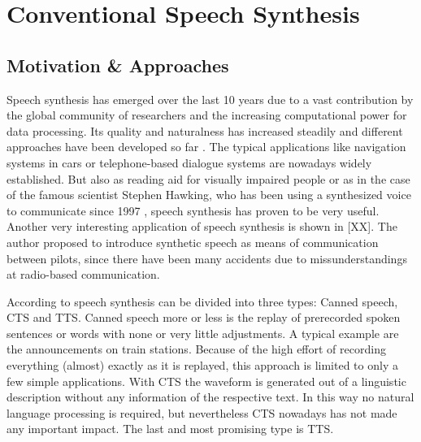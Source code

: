 

\section{Conventional Speech Synthesis}
\label{sec:speech}

\subsection{Motivation \& Approaches}
\label{subsec:convenspeech}

Speech synthesis has emerged over the last 10 years due to a vast contribution by the global community of researchers and the increasing computational power for data processing. Its quality and naturalness has increased steadily and different approaches have been developed so far \cite{suendermann:challenges}. The typical applications like navigation systems in cars or telephone-based dialogue systems are nowadays widely established. But also as reading aid for visually impaired people \cite{readspeaker:tts} or as in the case of the famous scientist Stephen Hawking, who has been using a synthesized voice to communicate since 1997 \cite{hawking:speech}, speech synthesis has proven to be very useful. Another very interesting application of speech synthesis is shown in [XX]. The author proposed to introduce synthetic speech as means of communication between pilots, since there have been many accidents due to missunderstandings at radio-based communication. %

According to \cite{hinterleitner:quality} speech synthesis can be divided into three types: Canned speech, \ac{CTS} and \ac{TTS}. Canned speech more or less is the replay of prerecorded spoken sentences or words with none or very little adjustments. A typical example are the announcements on train stations. Because of the high effort of recording everything (almost) exactly as it is replayed, this approach is limited to only a few simple applications. With \ac{CTS} the waveform is generated out of a linguistic description without any information of the respective text. In this way no natural language processing is required, but nevertheless \ac{CTS} nowadays has not made any important impact. The last and most promising type is \ac{TTS}.

